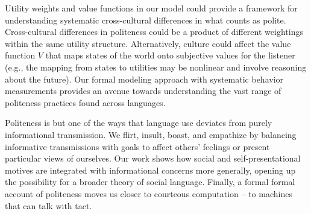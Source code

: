 \documentclass[9pt,twocolumn,twoside,lineno]{main_class_file}
\begin{document}
%
%

Utility weights and value functions in our model could provide a framework for understanding systematic
cross-cultural differences in what counts as polite. Cross-cultural differences in politeness could be a product of different weightings within the same
utility structure. Alternatively, culture could affect
the value function \(V\) that maps states of the world onto subjective
values for the listener (e.g., the mapping from states to utilities may
be nonlinear and involve reasoning about the future). 
Our formal modeling approach with systematic behavior measurements provides an avenue towards understanding the vast range of politeness practices found across languages.

Politeness is but one of the ways that language use deviates from purely
informational transmission. We flirt, insult, boast, and empathize by balancing informative transmissions with goals to affect others' feelings or
present particular views of ourselves. Our work shows how social and
self-presentational motives are integrated with informational concerns more
generally, opening up the possibility for a broader theory of social
language. 
Finally, a formal formal account of politeness moves us closer to
courteous computation -- to machines that can talk with tact.
\end{document}
